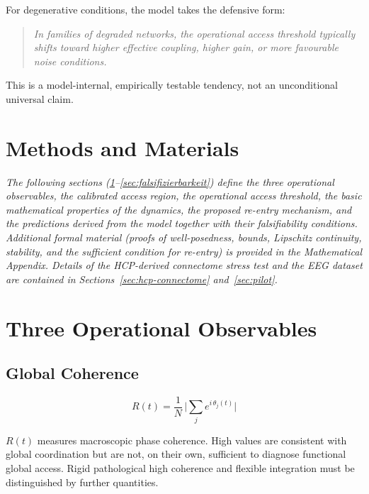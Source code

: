 \documentclass[11pt,a4paper]{article}
\theoremstyle{plain}
\theoremstyle{definition}
\theoremstyle{remark}
\begin{document}
For degenerative conditions, the model takes the defensive form:

\begin{quote}
\itshape
In families of degraded networks, the operational access threshold typically shifts toward higher effective coupling, higher gain, or more favourable noise conditions.
\end{quote}

This is a model-internal, empirically testable tendency, not an unconditional universal claim.


\section*{Methods and Materials}

\noindent\textit{The following sections (\ref{sec:observablen}--\ref{sec:falsifizierbarkeit}) define the three operational observables, the calibrated access region, the operational access threshold, the basic mathematical properties of the dynamics, the proposed re-entry mechanism, and the predictions derived from the model together with their falsifiability conditions. Additional formal material (proofs of well-posedness, bounds, Lipschitz continuity, stability, and the sufficient condition for re-entry) is provided in the Mathematical Appendix. Details of the HCP-derived connectome stress test and the EEG dataset are contained in Sections~\ref{sec:hcp-connectome} and~\ref{sec:pilot}.}

\section{Three Operational Observables}
\label{sec:observablen}

\subsection{Global Coherence}

\begin{equation}
\label{eq:R}
R(t) = \frac{1}{N}\,\biggl|\sum_{j} e^{i\,\theta_j(t)}\biggr|
\end{equation}

$R(t)$ measures macroscopic phase coherence. High values are consistent with global coordination but are not, on their own, sufficient to diagnose functional global access. Rigid pathological high coherence and flexible integration must be distinguished by further quantities.
\end{document}
